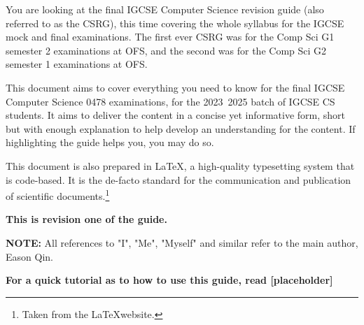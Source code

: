 \documentclass[../main.tex]{subfiles}
\begin{document}
You are looking at the final IGCSE Computer Science revision guide (also referred to as the CSRG), this time covering the whole syllabus for the IGCSE mock and final examinations. The first ever CSRG was for the Comp Sci G1 semester 2 examinations at OFS, and the second was for the Comp Sci G2 semester 1 examinations at OFS.

This document aims to cover everything you need to know for the final IGCSE Computer Science 0478 examinations, for the 2023~2025 batch of IGCSE CS students. It aims to deliver the content in a concise yet informative form, short but with enough explanation to help develop an understanding for the content. If highlighting the guide helps you, you may do so.

This document is also prepared in \LaTeX, a high-quality typesetting system that is code-based. It is the de-facto standard for the communication and publication of scientific documents.\footnote{Taken from the \LaTeX website.}

\textbf{This is revision one of the guide.}

\textbf{NOTE:} All references to "I", "Me", "Myself" and similar refer to the main author, Eason Qin.

\textbf{For a quick tutorial as to how to use this guide, read [placeholder]} 
\end{document}
